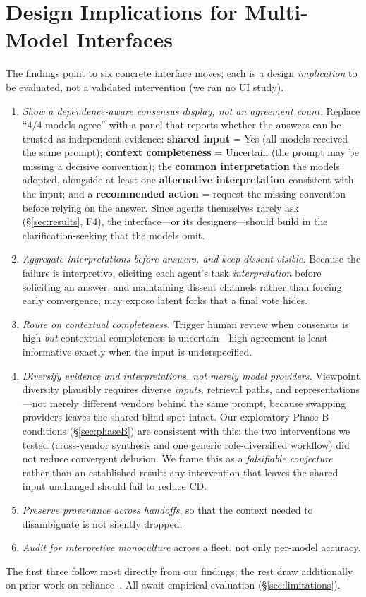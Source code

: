\documentclass[acmsmall,screen,nonacm]{acmart}
\newcommand{\cd}{\textsf{CD}}
\begin{document}
\section{Design Implications for Multi-Model Interfaces}
\label{sec:implications}
The findings point to six concrete interface moves; each is a design \emph{implication} to be evaluated, not
a validated intervention (we ran no UI study).
\begin{enumerate}
\item \emph{Show a dependence-aware consensus display, not an agreement count.} Replace ``$4/4$ models
agree'' with a panel that reports whether the answers can be trusted as independent evidence:
\textbf{shared input} = Yes (all models received the same prompt); \textbf{context completeness} = Uncertain
(the prompt may be missing a decisive convention); the \textbf{common interpretation} the models adopted,
alongside at least one \textbf{alternative interpretation} consistent with the input; and a
\textbf{recommended action} = request the missing convention before relying on the answer. Since agents
themselves rarely ask (\S\ref{sec:results}, F4), the interface---or its designers---should build in the
clarification-seeking that the models omit.
\item \emph{Aggregate interpretations before answers, and keep dissent visible.} Because the failure is
interpretive, eliciting each agent's task \emph{interpretation} before soliciting an answer, and maintaining
dissent channels rather than forcing early convergence, may expose latent forks that a final vote hides.
\item \emph{Route on contextual completeness.} Trigger human review when consensus is high \emph{but}
contextual completeness is uncertain---high agreement is least informative exactly when the input is
underspecified.
\item \emph{Diversify evidence and interpretations, not merely model providers.} Viewpoint diversity
plausibly requires diverse \emph{inputs}, retrieval paths, and representations---not merely different vendors
behind the same prompt, because swapping providers leaves the shared blind spot intact. Our exploratory
Phase B conditions (\S\ref{sec:phaseB}) are consistent with this: the two interventions we tested
(cross-vendor synthesis and one generic role-diversified workflow) did not reduce convergent delusion. We
frame this as a \emph{falsifiable conjecture} rather than an established result: any intervention that
leaves the shared input unchanged should fail to reduce \cd{}.
\item \emph{Preserve provenance across handoffs}, so that the context needed to disambiguate is not silently
dropped.
\item \emph{Audit for interpretive monoculture} across a fleet, not only per-model accuracy.
\end{enumerate}
\noindent The first three follow most directly from our findings; the rest draw additionally on prior work on
reliance~\cite{vasconcelos2023explanations}. All await empirical evaluation (\S\ref{sec:limitations}).
\end{document}
